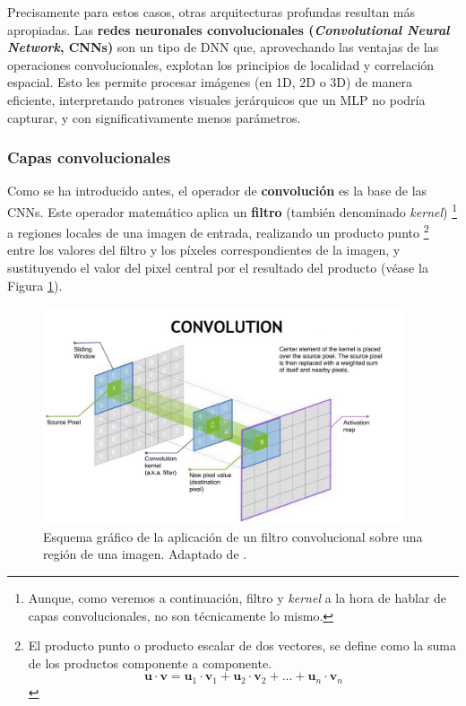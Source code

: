 Precisamente para estos casos, otras arquitecturas profundas resultan más apropiadas.
Las \textbf{redes neuronales convolucionales (\textit{Convolutional Neural Network}, CNNs)} son un 
tipo de DNN que, aprovechando las ventajas de las operaciones convolucionales, explotan los principios de 
localidad y correlación espacial. Esto les permite procesar imágenes (en 1D, 2D o 3D) de manera eficiente, 
interpretando patrones visuales jerárquicos que un MLP no podría capturar, y con significativamente menos 
parámetros.


\subsubsection{Capas convolucionales}

Como se ha introducido antes, el operador de \textbf{convolución} es la base de las CNNs. Este operador 
matemático aplica un \textbf{filtro} (también denominado \textit{kernel})%
\footnote{
    Aunque, como veremos a continuación, filtro y \textit{kernel} a la hora de hablar de capas 
    convolucionales, no son técnicamente lo mismo.
} 
a regiones locales de una imagen de entrada, realizando un producto punto%
\footnote{
    El producto punto o producto escalar de dos vectores, se define como la suma de los productos componente a 
    componente. 
    $$
    \mathbf{u} \cdot \mathbf{v} = \mathbf{u}_1 \cdot \mathbf{v}_1 + \mathbf{u}_2 \cdot \mathbf{v}_2 + ... + 
    \mathbf{u}_n \cdot \mathbf{v}_n
    $$
} 
entre los valores del filtro y los píxeles correspondientes de la imagen, y sustituyendo el valor del pixel 
central por el resultado del producto (véase la Figura \ref{fig:conv_op}).

\begin{figure}[h]
    \centering
    \includegraphics[width=0.95\textwidth]{capitulos/cap_02/imagenes/convolution_operation.jpg}
    \caption[Esquema gráfico de la aplicación de un filtro convolucional sobre una región de una imagen.]{
        Esquema gráfico de la aplicación de un filtro convolucional sobre una región de una imagen.
        Adaptado de \cite{nvidia2025convolutionoperation}.
    } 
    \label{fig:conv_op}
\end{figure}

